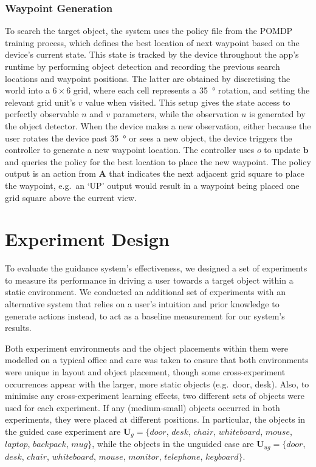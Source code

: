 \documentclass[runningheads]{llncs}
\DeclareRobustCommand{\tofix}[1]{{\sethlcolor{yellow}\hl{[#1]}}}
\begin{document}
\subsubsection{Waypoint Generation}
To search the target object, the system uses the policy file from the POMDP training process, which defines the best location of next waypoint based on the device's current state.
This state is tracked by the device throughout the app's runtime by performing object detection and recording the previous search locations and waypoint positions.
The latter are obtained by discretising the world into a $6\times6$ grid, where each cell represents a \SI{35}{\degree} rotation, and setting the relevant grid unit's $v$ value when visited.
This setup gives the state access to perfectly observable $n$ and $v$ parameters, while the observation $u$ is generated by the object detector. 
When the device makes a new observation, either because the user rotates the device past \SI{35}{\degree} or sees a new object, the device triggers the controller to generate a new waypoint location.
The controller uses $o$ to update $\mathbf{b}$ and queries the policy for the best location to place the new waypoint. 
The policy output is an action from $\mathbf{A}$ that indicates the next adjacent grid square to place the waypoint, e.g.\ an `UP' output would result in a waypoint being placed one grid square above the current view. 

\section{Experiment Design}\label{sec:experiments}

To evaluate the guidance system's effectiveness, we designed a set of experiments to measure its performance in driving a user towards a target object within a static environment. 
We conducted an additional set of experiments with an alternative system that relies on a user's intuition and prior knowledge to generate actions instead, to act as a baseline measurement for our system's results. 

Both experiment environments and the object placements within them were modelled on a typical office and care was taken to ensure that both environments were unique in layout and object placement, though some cross-experiment occurrences appear with the larger, more static objects (e.g.\ door, desk). 
Also, to minimise any cross-experiment learning effects, two different sets of objects were used for each experiment. If any (medium-small) objects occurred in both experiments, they were placed at different positions. 
In particular, the objects in the guided case experiment are $\mathbf{U}_{g} = \{ door$, $desk$, $chair$, $whiteboard$, $mouse$, $laptop$, $backpack$, $mug \}$, while the objects in the unguided case are $\mathbf{U}_{ug} = \{ door$, $desk$, $chair$, $whiteboard$, $mouse$, $monitor$, $telephone$, $keyboard \}$.
\end{document}
